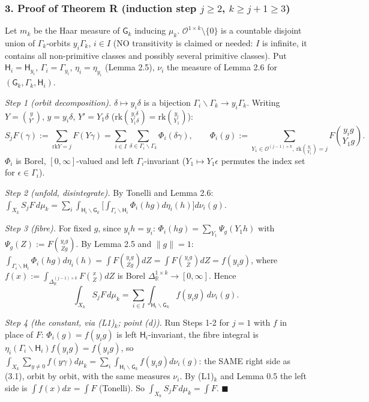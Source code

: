 \hypertarget{proof-of-theorem-r-induction-step-jge2-kge-j1ge3}{%
\subsubsection*{\texorpdfstring{3. Proof of Theorem R (induction step \(j\ge2\), \(k\ge j+1\ge3\))}{3. Proof of Theorem R (induction step j\textbackslash ge2, k\textbackslash ge j+1\textbackslash ge3)}}\label{proof-of-theorem-r-induction-step-jge2-kge-j1ge3}}

Let \(m_k\) be the Haar measure of \(\mathsf G_k\) inducing \(\mu_k\). \(\mathcal O^{1\times k}\setminus\{0\}\) is a countable disjoint union of \(\Gamma_k\)-orbits \(y_i\Gamma_k\), \(i\in I\) (NO transitivity is claimed or needed: \(I\) is infinite, it contains all non-primitive classes and possibly several primitive classes). Put \(\mathsf H_i=\mathsf H_{y_i}\), \(\Gamma_i=\Gamma_{y_i}\), \(\eta_i=\eta_{y_i}\) (Lemma 2.5), \(\nu_i\) the measure of Lemma 2.6 for \((\mathsf G_k,\Gamma_k,\mathsf H_i)\).

\emph{Step 1 (orbit decomposition).} \(\delta\mapsto y_i\delta\) is a bijection \(\Gamma_i\backslash\Gamma_k\to y_i\Gamma_k\). Writing \(Y=\binom{y}{Y'}\), \(y=y_i\delta\), \(Y'=Y_1\delta\) (\(\mathrm{rk}\binom{y_i\delta}{Y_1\delta}=\mathrm{rk}\binom{y_i}{Y_1}\)):
\[S_jF(\gamma):=\sum_{\mathrm{rk}Y=j}F(Y\gamma)=\sum_{i\in I}\sum_{\delta\in\Gamma_i\backslash\Gamma_k}\Phi_i(\delta\gamma),\qquad\Phi_i(g):=\sum_{Y_1\in\mathcal O^{(j-1)\times k},\ \mathrm{rk}\binom{y_i}{Y_1}=j}F\binom{y_ig}{Y_1g}.\]
\(\Phi_i\) is Borel, \([0,\infty]\)-valued and left \(\Gamma_i\)-invariant (\(Y_1\mapsto Y_1\epsilon\) permutes the index set for \(\epsilon\in\Gamma_i\)).

\emph{Step 2 (unfold, disintegrate).} By Tonelli and Lemma 2.6: \(\int_{X_k}S_jF\,d\mu_k=\sum_i\int_{\mathsf H_i\backslash\mathsf G_k}\big[\int_{\Gamma_i\backslash\mathsf H_i}\Phi_i(hg)d\eta_i(h)\big]d\nu_i(g)\).

\emph{Step 3 (fibre).} For fixed \(g\), since \(y_ih=y_i\): \(\Phi_i(hg)=\sum_{Y_1}\Psi_g(Y_1h)\) with \(\Psi_g(Z):=F\binom{y_ig}{Zg}\). By Lemma 2.5 and \(\|g\|=1\): \(\int_{\Gamma_i\backslash\mathsf H_i}\Phi_i(hg)d\eta_i(h)=\int F\binom{y_ig}{Zg}dZ=\int F\binom{y_ig}{Z}dZ=f(y_ig)\), where \(f(x):=\int_{\Delta_{\mathbb R}^{(j-1)\times k}}F\binom{x}{Z}dZ\) is Borel \(\Delta_{\mathbb R}^{1\times k}\to[0,\infty]\). Hence
\[\int_{X_k}S_jF\,d\mu_k=\sum_{i\in I}\int_{\mathsf H_i\backslash\mathsf G_k}f(y_ig)\,d\nu_i(g).\tag{3.1}\]

\emph{Step 4 (the constant, via (L1)\(_k\); point (d)).} Run Steps 1-2 for \(j=1\) with \(f\) in place of \(F\): \(\Phi_i(g)=f(y_ig)\) is left \(\mathsf H_i\)-invariant, the fibre integral is \(\eta_i(\Gamma_i\backslash\mathsf H_i)f(y_ig)=f(y_ig)\), so \(\int_{X_k}\sum_{y\ne0}f(y\gamma)d\mu_k=\sum_i\int_{\mathsf H_i\backslash\mathsf G_k}f(y_ig)d\nu_i(g)\): the SAME right side as (3.1), orbit by orbit, with the same measures \(\nu_i\). By (L1)\(_k\) and Lemma 0.5 the left side is \(\int f(x)dx=\int F\) (Tonelli). So \(\int_{X_k}S_jF\,d\mu_k=\int F\). \(\blacksquare\)

